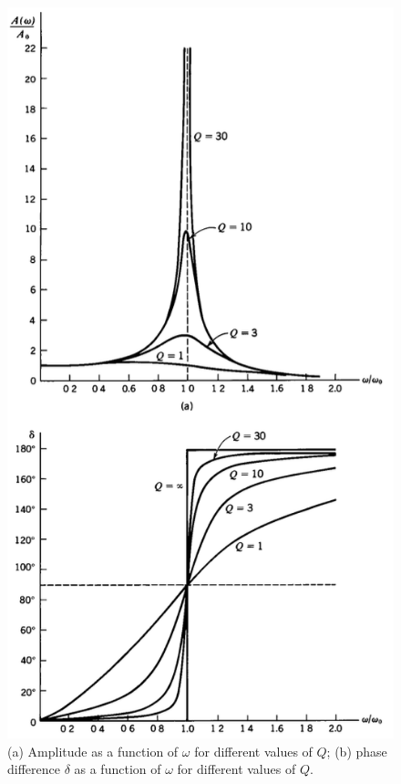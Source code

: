 \begin{fullwidth}
\begin{figure}
	\centering
	\includegraphics[scale=0.6]{phys232/Ch4-A-delta-vs-Q.png} \caption{(a) Amplitude as a function of $\omega$ for different values of $Q$; (b) phase difference $\delta$ as a function of $\omega$ for different values of $Q$.}	\label{ch4:fig-A-delta-vs-Q}
\end{figure}
\end{fullwidth}

